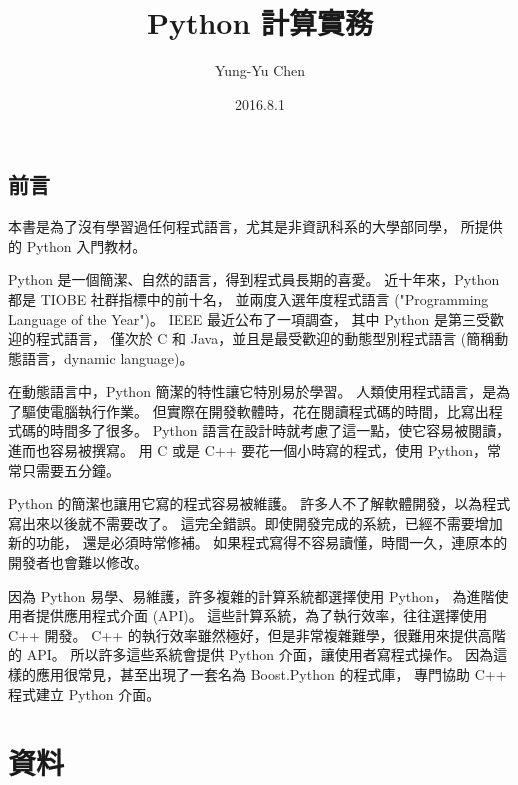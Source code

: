 \documentclass[a4paper,12pt]{book}
\begin{document}
\title{Python 計算實務}
\author{Yung-Yu Chen}
\date{2016.8.1}

\maketitle

\tableofcontents

\hspace{.5cm}

\frontmatter

\chapter*{前言}

本書是為了沒有學習過任何程式語言，尤其是非資訊科系的大學部同學，
所提供的 Python 入門教材。

Python 是一個簡潔、自然的語言，得到程式員長期的喜愛。
近十年來，Python 都是 TIOBE 社群指標\cite{tiobe_index}中的前十名，
並兩度入選年度程式語言 ("Programming Language of the Year")。
IEEE 最近公布了一項調查\cite{ieee_pl_2016}，
其中 Python 是第三受歡迎的程式語言，
僅次於 C 和 Java，並且是最受歡迎的動態型別程式語言
(簡稱動態語言，dynamic language)。

在動態語言中，Python 簡潔的特性讓它特別易於學習。
人類使用程式語言，是為了驅使電腦執行作業。
但實際在開發軟體時，花在閱讀程式碼的時間，比寫出程式碼的時間多了很多。
Python 語言在設計時就考慮了這一點，使它容易被閱讀，進而也容易被撰寫。
用 C 或是 C++ 要花一個小時寫的程式，使用 Python，常常只需要五分鐘。

Python 的簡潔也讓用它寫的程式容易被維護。
許多人不了解軟體開發，以為程式寫出來以後就不需要改了。
這完全錯誤。即使開發完成的系統，已經不需要增加新的功能，
還是必須時常修補。
如果程式寫得不容易讀懂，時間一久，連原本的開發者也會難以修改。

因為 Python 易學、易維護，許多複雜的計算系統都選擇使用 Python，
為進階使用者提供應用程式介面 (API)。
這些計算系統，為了執行效率，往往選擇使用 C++ 開發。
C++ 的執行效率雖然極好，但是非常複雜難學，很難用來提供高階的 API。
所以許多這些系統會提供 Python 介面，讓使用者寫程式操作。
因為這樣的應用很常見，甚至出現了一套名為 Boost.Python 的程式庫，
專門協助 C++ 程式建立 Python 介面。

\mainmatter

\part{資料}
\end{document}
